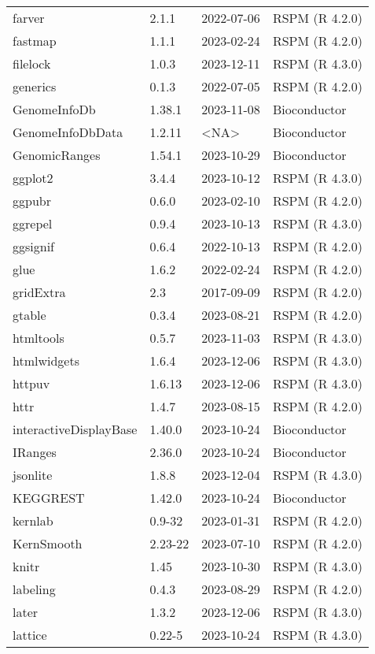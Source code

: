 \begin{tabular}{llll}
farver & 2.1.1 & 2022-07-06 & RSPM (R 4.2.0)\\
fastmap & 1.1.1 & 2023-02-24 & RSPM (R 4.2.0)\\
filelock & 1.0.3 & 2023-12-11 & RSPM (R 4.3.0)\\
generics & 0.1.3 & 2022-07-05 & RSPM (R 4.2.0)\\
GenomeInfoDb & 1.38.1 & 2023-11-08 & Bioconductor\\
\addlinespace
GenomeInfoDbData & 1.2.11 & <NA> & Bioconductor\\
GenomicRanges & 1.54.1 & 2023-10-29 & Bioconductor\\
ggplot2 & 3.4.4 & 2023-10-12 & RSPM (R 4.3.0)\\
ggpubr & 0.6.0 & 2023-02-10 & RSPM (R 4.2.0)\\
ggrepel & 0.9.4 & 2023-10-13 & RSPM (R 4.3.0)\\
\addlinespace
ggsignif & 0.6.4 & 2022-10-13 & RSPM (R 4.2.0)\\
glue & 1.6.2 & 2022-02-24 & RSPM (R 4.2.0)\\
gridExtra & 2.3 & 2017-09-09 & RSPM (R 4.2.0)\\
gtable & 0.3.4 & 2023-08-21 & RSPM (R 4.2.0)\\
htmltools & 0.5.7 & 2023-11-03 & RSPM (R 4.3.0)\\
\addlinespace
htmlwidgets & 1.6.4 & 2023-12-06 & RSPM (R 4.3.0)\\
httpuv & 1.6.13 & 2023-12-06 & RSPM (R 4.3.0)\\
httr & 1.4.7 & 2023-08-15 & RSPM (R 4.2.0)\\
interactiveDisplayBase & 1.40.0 & 2023-10-24 & Bioconductor\\
IRanges & 2.36.0 & 2023-10-24 & Bioconductor\\
\addlinespace
jsonlite & 1.8.8 & 2023-12-04 & RSPM (R 4.3.0)\\
KEGGREST & 1.42.0 & 2023-10-24 & Bioconductor\\
kernlab & 0.9-32 & 2023-01-31 & RSPM (R 4.2.0)\\
KernSmooth & 2.23-22 & 2023-07-10 & RSPM (R 4.2.0)\\
knitr & 1.45 & 2023-10-30 & RSPM (R 4.3.0)\\
\addlinespace
labeling & 0.4.3 & 2023-08-29 & RSPM (R 4.2.0)\\
later & 1.3.2 & 2023-12-06 & RSPM (R 4.3.0)\\
lattice & 0.22-5 & 2023-10-24 & RSPM (R 4.3.0)\\

\end{tabular}
